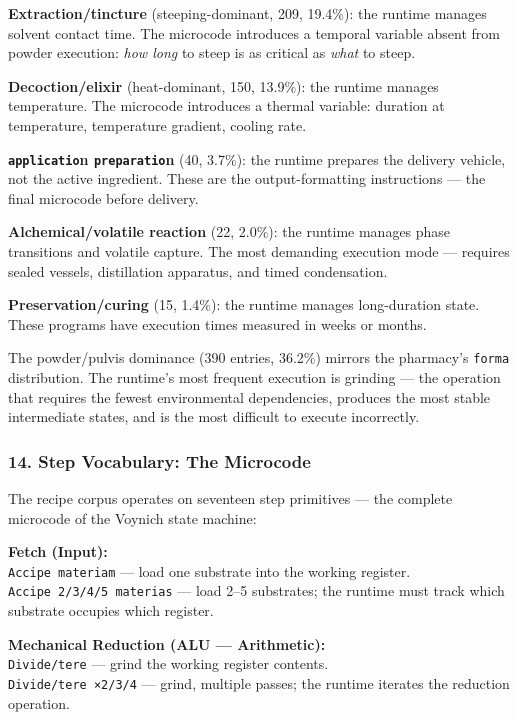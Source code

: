 \textbf{Extraction/tincture} (steeping-dominant, 209, 19.4\%): the
runtime manages solvent contact time. The microcode introduces a
temporal variable absent from powder execution: \emph{how long} to steep
is as critical as \emph{what} to steep.

\textbf{Decoction/elixir} (heat-dominant, 150, 13.9\%): the runtime
manages temperature. The microcode introduces a thermal variable:
duration at temperature, temperature gradient, cooling rate.

\textbf{\texttt{applicatio}n \texttt{preparatio}n} (40, 3.7\%): the
runtime prepares the delivery vehicle, not the active ingredient. These
are the output-formatting instructions --- the final microcode before
delivery.

\textbf{Alchemical/volatile reaction} (22, 2.0\%): the runtime manages
phase transitions and volatile capture. The most demanding execution
mode --- requires sealed vessels, distillation apparatus, and timed
condensation.

\textbf{Preservation/curing} (15, 1.4\%): the runtime manages
long-duration state. These programs have execution times measured in
weeks or months.

The powder/pulvis dominance (390 entries, 36.2\%) mirrors the pharmacy's
\texttt{forma} distribution. The runtime's most frequent execution is
grinding --- the operation that requires the fewest environmental
dependencies, produces the most stable intermediate states, and is the
most difficult to execute incorrectly.

\hypertarget{step-vocabulary-the-microcode}{%
\subsubsection{14. Step Vocabulary: The
Microcode}\label{step-vocabulary-the-microcode}}

The recipe corpus operates on seventeen step primitives --- the complete
microcode of the Voynich state machine:

\textbf{Fetch (Input):}\\
\texttt{Accipe\ materiam} --- load one substrate into the working
register.\\
\texttt{Accipe\ 2/3/4/5\ materias} --- load 2--5 substrates; the runtime
must track which substrate occupies which register.

\textbf{Mechanical Reduction (ALU --- Arithmetic):}\\
\texttt{Divide/tere} --- grind the working register contents.\\
\texttt{Divide/tere\ ×2/3/4} --- grind, multiple passes; the runtime
iterates the reduction operation.

